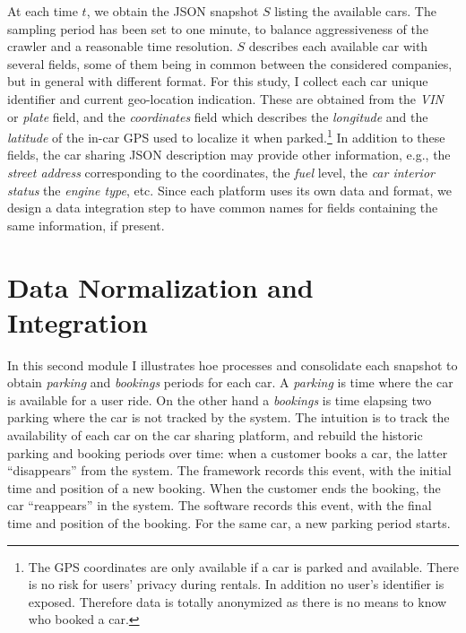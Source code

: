 At each time $t$, we obtain the JSON snapshot $S$ listing the available cars. 
The sampling period has been set to one minute, to balance aggressiveness of the crawler and a reasonable time resolution.
$S$ describes each available car with several fields, some of them being in common between the considered companies, but in general with different format.
For this study, I collect each car unique identifier and current geo-location indication.
These are obtained from the \textit{VIN} or \textit{plate} field, and the \textit{coordinates} field which describes the \textit{longitude} and the \textit{latitude} of the in-car GPS used to localize it when  parked.\footnote{The GPS coordinates are only available if a car is parked and available. There is no risk for users' privacy during rentals. In addition no user's identifier is exposed. Therefore data is totally anonymized as there is no means to know who booked a car.}
In addition to these fields, the car sharing JSON description may provide other information, e.g., the \textit{street address} corresponding to the coordinates, the \textit{fuel} level, the \textit{car interior status} the \textit{engine type}, etc. Since each platform uses its own data and format, we design a data integration step to have common names for fields containing the same information, if present.

\section{Data Normalization and Integration}
\label{sec:2_4_data_normalization}
In this second module I illustrates hoe \tool processes and consolidate each snapshot to obtain \emph{parking} and \emph{bookings} periods for each car. A \emph{parking} is time where the car is available for a user ride. On the other hand a \emph{bookings} is time elapsing two parking where the car is not tracked by the system. The intuition is to track the availability of each car on the car sharing platform, and rebuild the historic parking and booking periods over time: when a customer books a car, the latter ``disappears'' from the system. The framework records this event, with the initial time and position of a new booking. When the customer ends the booking, the car ``reappears'' in the system. The software records this event, with the final time and position of the booking. For the same car, a new parking period starts.

